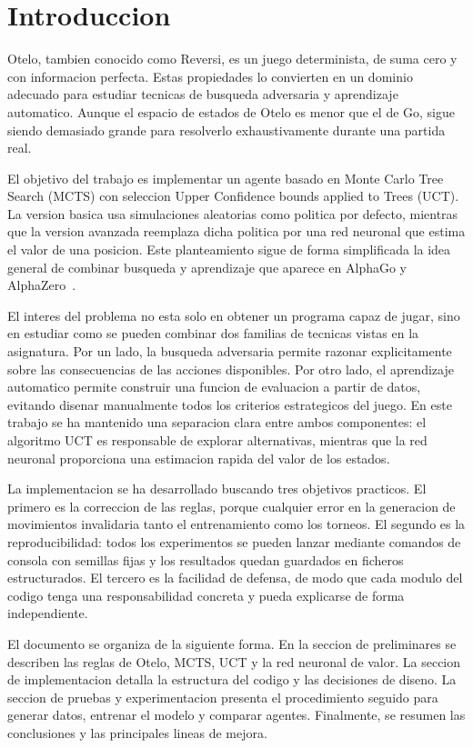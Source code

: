 \documentclass[conference,a4paper]{IEEEtran}
\begin{document}
\section{Introduccion}

Otelo, tambien conocido como Reversi, es un juego determinista, de suma cero y
con informacion perfecta. Estas propiedades lo convierten en un dominio adecuado
para estudiar tecnicas de busqueda adversaria y aprendizaje automatico. Aunque
el espacio de estados de Otelo es menor que el de Go, sigue siendo demasiado
grande para resolverlo exhaustivamente durante una partida real.

El objetivo del trabajo es implementar un agente basado en Monte Carlo Tree
Search (MCTS) con seleccion Upper Confidence bounds applied to Trees (UCT). La
version basica usa simulaciones aleatorias como politica por defecto, mientras
que la version avanzada reemplaza dicha politica por una red neuronal que estima
el valor de una posicion. Este planteamiento sigue de forma simplificada la idea
general de combinar busqueda y aprendizaje que aparece en AlphaGo y
AlphaZero~\cite{silver2016, silver2017}.

El interes del problema no esta solo en obtener un programa capaz de jugar, sino
en estudiar como se pueden combinar dos familias de tecnicas vistas en la
asignatura. Por un lado, la busqueda adversaria permite razonar explicitamente
sobre las consecuencias de las acciones disponibles. Por otro lado, el
aprendizaje automatico permite construir una funcion de evaluacion a partir de
datos, evitando disenar manualmente todos los criterios estrategicos del juego.
En este trabajo se ha mantenido una separacion clara entre ambos componentes:
el algoritmo UCT es responsable de explorar alternativas, mientras que la red
neuronal proporciona una estimacion rapida del valor de los estados.

La implementacion se ha desarrollado buscando tres objetivos practicos. El
primero es la correccion de las reglas, porque cualquier error en la generacion
de movimientos invalidaria tanto el entrenamiento como los torneos. El segundo
es la reproducibilidad: todos los experimentos se pueden lanzar mediante
comandos de consola con semillas fijas y los resultados quedan guardados en
ficheros estructurados. El tercero es la facilidad de defensa, de modo que cada
modulo del codigo tenga una responsabilidad concreta y pueda explicarse de forma
independiente.

El documento se organiza de la siguiente forma. En la seccion de preliminares se
describen las reglas de Otelo, MCTS, UCT y la red neuronal de valor. La seccion
de implementacion detalla la estructura del codigo y las decisiones de diseno.
La seccion de pruebas y experimentacion presenta el procedimiento seguido para
generar datos, entrenar el modelo y comparar agentes. Finalmente, se resumen las
conclusiones y las principales lineas de mejora.
\end{document}
